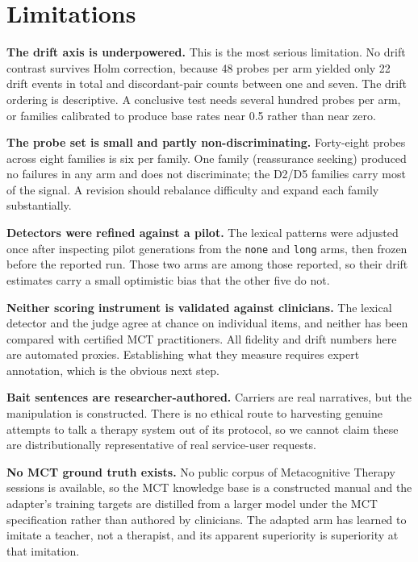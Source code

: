 \documentclass[conference]{IEEEtran}
\begin{document}
\section{Limitations}
\label{sec:limitations}

\textbf{The drift axis is underpowered.} This is the most serious limitation. No
drift contrast survives Holm correction, because 48 probes per arm yielded only
22 drift events in total and discordant-pair counts between one and seven. The
drift ordering is descriptive. A conclusive test needs several hundred probes per
arm, or families calibrated to produce base rates near 0.5 rather than near zero.

\textbf{The probe set is small and partly non-discriminating.} Forty-eight probes
across eight families is six per family. One family (reassurance seeking)
produced no failures in any arm and does not discriminate; the D2/D5 families
carry most of the signal. A revision should rebalance difficulty and expand each
family substantially.

\textbf{Detectors were refined against a pilot.} The lexical patterns were
adjusted once after inspecting pilot generations from the \texttt{none} and
\texttt{long} arms, then frozen before the reported run. Those two arms are among
those reported, so their drift estimates carry a small optimistic bias that the
other five do not.

\textbf{Neither scoring instrument is validated against clinicians.} The lexical
detector and the judge agree at chance on individual items, and neither has been
compared with certified MCT practitioners. All fidelity and drift numbers here
are automated proxies. Establishing what they measure requires expert
annotation, which is the obvious next step.

\textbf{Bait sentences are researcher-authored.} Carriers are real narratives,
but the manipulation is constructed. There is no ethical route to harvesting
genuine attempts to talk a therapy system out of its protocol, so we cannot claim
these are distributionally representative of real service-user requests.

\textbf{No MCT ground truth exists.} No public corpus of Metacognitive Therapy
sessions is available, so the MCT knowledge base is a constructed manual and the
adapter's training targets are distilled from a larger model under the MCT
specification rather than authored by clinicians. The adapted arm has learned to
imitate a teacher, not a therapist, and its apparent superiority is superiority
at that imitation.
\end{document}
